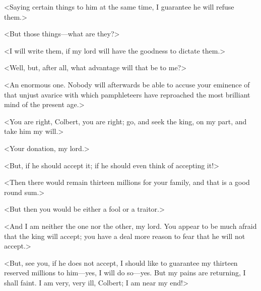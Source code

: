 <Saying certain things to him at the same time, I guarantee he will refuse them.>

<But those things—what are they?>

<I will write them, if my lord will have the goodness to dictate them.>

<Well, but, after all, what advantage will that be to me?>

<An enormous one. Nobody will afterwards be able to accuse your eminence of that unjust avarice with which pamphleteers have reproached the most brilliant mind of the present age.>

<You are right, Colbert, you are right; go, and seek the king, on my part, and take him my will.>

<Your donation, my lord.>

<But, if he should accept it; if he should even think of accepting it!>

<Then there would remain thirteen millions for your family, and that is a good round sum.>

<But then you would be either a fool or a traitor.>

<And I am neither the one nor the other, my lord. You appear to be much afraid that the king will accept; you have a deal more reason to fear that he will not accept.>

<But, see you, if he does not accept, I should like to guarantee my thirteen reserved millions to him—yes, I will do so—yes. But my pains are returning, I shall faint. I am very, very ill, Colbert; I am near my end!>

